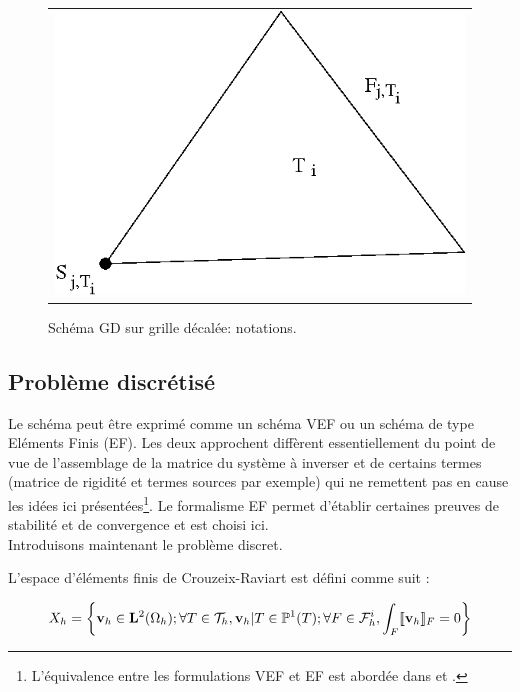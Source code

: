 \begin{appendix}
\begin{figure}[h]
\begin{center}
\begin{tabular}{c}
\includegraphics[scale=0.3]{Figs/notations-VEF.png}
\end{tabular}
\end{center}
\caption{Schéma GD sur grille décalée: notations.}
\end{figure}



\subsection{Probl\`eme discr\'etis\'e}
Le sch\'ema peut \^etre exprim\'e comme un sch\'ema VEF ou un sch\'ema de type El\'ements Finis (EF). Les deux approchent diff\`erent essentiellement du point
de vue de l'assemblage de la matrice du syst\`eme \`a inverser et de certains termes (matrice de rigidit\'e et termes sources par exemple) qui ne remettent pas
en cause les id\'ees ici pr\'esent\'ees\footnote{L'\'equivalence entre les formulations VEF et EF est abord\'ee dans \cite{Emonot} et \cite{Heib}.}.
Le formalisme EF permet d'\'etablir certaines preuves de stabilit\'e et de convergence et est choisi ici.\\
Introduisons maintenant le probl\`eme discret.

L'espace d'\'el\'ements finis de Crouzeix-Raviart est d\'efini comme suit :

\begin{equation}
\label{Xh}
\ds{
X_h = \left\lbrace \mbf{v}_h \in \mbf{L}^2(\Omega_h); \forall T \in \mathcal T _h, \mbf{v}_{h}\vert T\in \mathbb P^1(T); \forall F \in \mathcal F _h^i, \int _F  \llbracket \mbf{v}_h \rrbracket _F =0 \right\rbrace
}
\end{equation}
 

\end{appendix}
